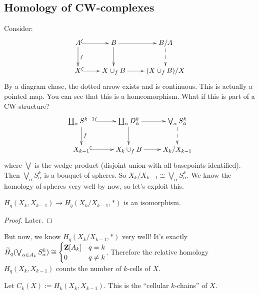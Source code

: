 \subsection{Homology of CW-complexes}
Consider:
\begin{equation*}
\xymatrix{A\ar@{^(->}[r]\ar[d]^f & B\ar[r]\ar[d] & B/A\ar@{-->}[d]\\
X\ar@{^(->}[r] & X\cup_f B\ar[r] & (X\cup_fB)/X}
\end{equation*}
By a diagram chase, the dotted arrow exists and is continuous. This is actually a pointed map. You can see that this is a homeomorphism. What if this is part of a CW-structure?
\begin{equation*}
\xymatrix{\coprod_{\alpha}S^{k-1}\ar@{^(->}[r]\ar[d]^f & \coprod_{\alpha}D^k_\alpha\ar[r]\ar[d] & \bigvee_{\alpha}S^k_\alpha\ar@{-->}[d]\\
X_{k-1}\ar@{^(->}[r] & X_k\cup_f B\ar[r] & X_k/X_{k-1}}
\end{equation*}
where $\bigvee$ is the wedge product (disjoint union with all basepoints identified). Then $\bigvee_{\alpha}S^k_\alpha$ is a bouquet of spheres. So $X_k/X_{k-1}\cong\bigvee_{\alpha}S^k_\alpha$. We know the homology of spheres very well by now, so let's exploit this.
\begin{lemma}
$ H_q(X_k,X_{k-1})\to H_q(X_k/X_{k-1},\ast)$ is an isomorphism.
\end{lemma}
\begin{proof}
Later.
\end{proof}
But now, we know $ H_q(X_k/X_{k-1},\ast)$ very well! It's exactly $\widetilde{ H}_q(\bigvee_{\alpha\in A_k}S^k_\alpha)\cong\begin{cases}\mathbf Z[A_k] & q=k \\ 0 & q\neq k\end{cases}$. Therefore the relative homology $ H_q(X_k,X_{k-1})$ counts the number of $k$-cells of $X$.
\begin{definition}
Let $C_k(X):= H_k(X_k,X_{k-1})$. This is the ``cellular $k$-chains'' of $X$.
\end{definition}

